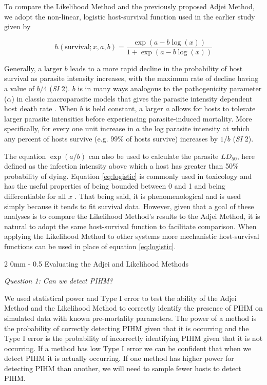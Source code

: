 \documentclass[12pt, a4paper]{article}
\makeatletter
\renewcommand{\subsection}{\@startsection
{subsection}%
{2}%
{0mm}%
{-\baselineskip}%
{0.5\baselineskip}%
{\normalfont\bf}} %
\makeatother
\begin{document}
To compare the Likelihood Method and the previously proposed Adjei Method, we adopt the non-linear, logistic host-survival function used in the earlier study given by

\begin{equation}
    h(\text{survival}; x, a, b) = \dfrac{\exp{(a - b \log(x))}}{1 + \exp{(a - b \log(x))}}
    \label{eq:logistic}
\end{equation}

Generally, a larger $b$ leads to a more rapid decline in the probability of host survival as parasite intensity increases, with the maximum rate of decline having a value of $b / 4$ (\emph{SI} 2). $b$ is in many ways analogous to the pathogenicity parameter ($\alpha$) in classic macroparasite models that gives the parasite intensity dependent host death rate \citep{AndersonandMay1978,Isham1995}. When $b$ is held constant, a larger $a$ allows for hosts to tolerate larger parasite intensities before experiencing parasite-induced mortality. More specifically, for every one unit increase in $a$ the log parasite intensity at which any percent of hosts survive (e.g. 99\% of hosts survive) increases by $1 / b$ (\emph{SI} 2).

The equation $\exp(a
/ b)$ can also be used to calculate the parasite $LD_{50}$, here defined as the
infection intensity above which a host has greater than 50\% probability of dying.  Equation \ref{eq:logistic} is commonly used in toxicology and has the useful properties of being bounded between 0 and 1 and being differentiable for all $x$ \citep{Collet2002}.  That being said, it is phenomenological and is used simply because it tends to fit survival data. However, given that a goal of these analyses is to
compare the Likelihood Method's results to the Adjei Method, it is natural
to adopt the same host-survival function to facilitate comparison.  When
applying the Likelihood Method to other systems more mechanistic host-survival functions can be used in place of equation \ref{eq:logistic}.

\subsection{Evaluating the Adjei and Likelihood Methods}

\emph{Question 1: Can we detect PIHM?}

We used statistical power and Type I error to test the ability of the Adjei Method and the Likelihood Method to correctly identify the presence of PIHM on simulated data with known pre-mortality parameters. The power of a method is the probability of correctly detecting PIHM given that it is occurring and the Type I error is the probability of incorrectly identifying PIHM given that it is not occurring. If a method has low Type I error we can be confident that when we detect PIHM it is actually occurring.  If one method has higher power for detecting PIHM than another, we will need to sample fewer hosts to detect PIHM.
\end{document}
